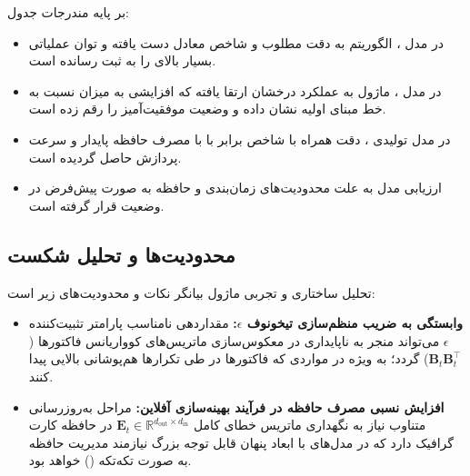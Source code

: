 بر پایه مندرجات جدول:
\begin{itemize}
    \item در مدل ، الگوریتم به دقت مطلوب  و شاخص  معادل  دست یافته و توان عملیاتی بسیار بالای  را به ثبت رسانده است.
    \item در مدل ، ماژول به عملکرد درخشان  ارتقا یافته که افزایشی به میزان  نسبت به خط مبنای اولیه نشان داده و وضعیت موفقیت‌آمیز  را رقم زده است.
    \item در مدل تولیدی ، دقت  همراه با شاخص  برابر با  با مصرف حافظه پایدار  و سرعت پردازش  حاصل گردیده است.
    \item ارزیابی مدل  به علت محدودیت‌های زمان‌بندی و حافظه به صورت پیش‌فرض در وضعیت  قرار گرفته است.
\end{itemize}

\subsection{محدودیت‌ها و تحلیل شکست}
تحلیل ساختاری و تجربی ماژول بیانگر نکات و محدودیت‌های زیر است:
\begin{itemize}
    \item \textbf{وابستگی به ضریب منظم‌سازی تیخونوف $\epsilon$:} مقداردهی نامناسب پارامتر تثبیت‌کننده $\epsilon$ می‌تواند منجر به ناپایداری در معکوس‌سازی ماتریس‌های کوواریانس فاکتورها ($\mathbf{B}_t \mathbf{B}_t^\top$) گردد؛ به ویژه در مواردی که فاکتورها در طی تکرارها هم‌پوشانی بالایی پیدا کنند.
    \item \textbf{افزایش نسبی مصرف حافظه در فرآیند بهینه‌سازی آفلاین:} مراحل به‌روزرسانی متناوب نیاز به نگهداری ماتریس خطای کامل $\mathbf{E}_t \in \mathbb{R}^{d_{\text{out}} \times d_{\text{in}}}$ در حافظه کارت گرافیک دارد که در مدل‌های با ابعاد پنهان قابل توجه بزرگ نیازمند مدیریت حافظه به صورت تکه‌تکه () خواهد بود.
\end{itemize}
